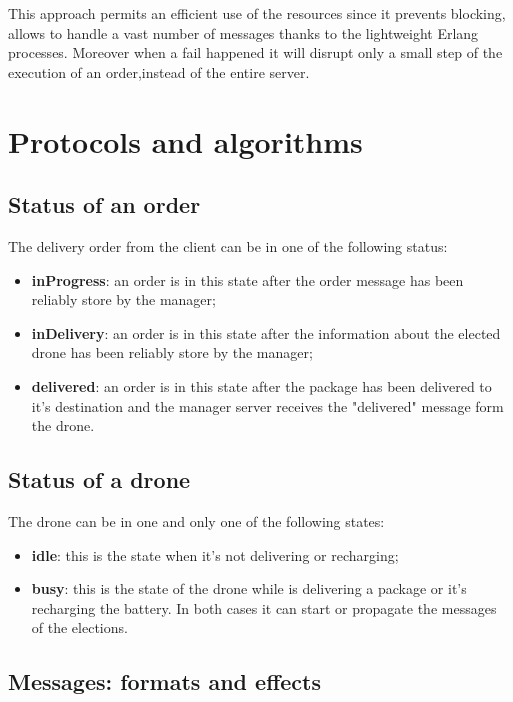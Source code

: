 \documentclass[a4paper, oneside]{memoir}
\begin{document}
This approach permits an efficient use of the resources since it prevents blocking, allows to handle a vast number of messages thanks to the lightweight Erlang processes. Moreover when a fail happened it will disrupt only a small step of the execution of an order,instead of the entire server.


\section{Protocols and algorithms}


\subsection{Status of an order}
The delivery order from the client can be in one of the following status:
\begin{itemize}
\item \textbf{inProgress}: an order is in this state after the order message has been reliably store by the manager;
\item \textbf{inDelivery}: an order is in this state after the information about the elected drone has been reliably store by the manager;
\item \textbf{delivered}: an order is in this state after the package has been delivered to it's destination and the manager server receives the "delivered" message form the drone.
\end{itemize}

\subsection{Status of a drone}
The drone can be in one and only one of the following states:
\begin{itemize}
	\item \textbf{idle}: this is the state when it's not delivering or recharging;
	\item \textbf{busy}: this is the state of the drone while is delivering a package or it's recharging the battery. In both cases it can start or propagate the messages of the elections.
\end{itemize}


\subsection{Messages: formats and effects}
\end{document}
